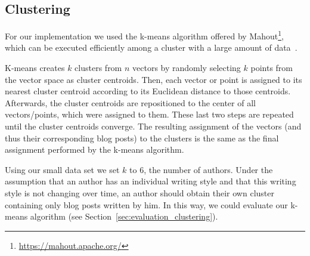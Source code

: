 \subsection{Clustering}
\label{sec:impl_clustering}

For our implementation we used the k-means algorithm offered by Mahout\footnote{\url{https://mahout.apache.org/}}, which can be executed efficiently among a cluster with a large amount of data~\cite{esteves2011k}.


K-means creates $k$ clusters from $n$ vectors by randomly selecting $k$ points from the vector space as cluster centroids.
Then, each vector or point is assigned to its nearest cluster centroid according to its Euclidean distance to those centroids.
Afterwards, the cluster centroids are repositioned to the center of all vectors/points, which were assigned to them.
These last two steps are repeated until the cluster centroids converge.
The resulting assignment of the vectors (and thus their corresponding blog posts) to the clusters is the same as the final assignment performed by the k-means algorithm.


Using our small data set we set $k$ to 6, the number of authors.
Under the assumption that an author has an individual writing style and that this writing style is not changing over time, an author should obtain their own cluster containing only blog posts written by him.
In this way, we could evaluate our k-means algorithm (see Section~\ref{sec:evaluation_clustering}).



